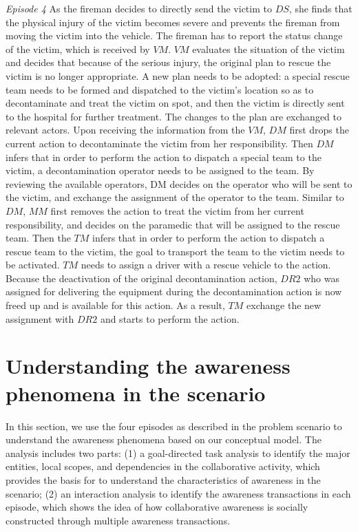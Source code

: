 \begin{scenario}
\footnotesize
\emph{Episode 4} As the fireman decides to directly send the victim to $DS$, she finds that the physical injury of the victim becomes severe and prevents the fireman from moving the victim into the vehicle. The fireman has to report the status change of the victim, which is received by $VM$. $VM$ evaluates the situation of the victim and decides that because of the serious injury, the original plan to rescue the victim is no longer appropriate. A new plan needs to be adopted: a special rescue team needs to be formed and dispatched to the victim’s location so as to decontaminate and treat the victim on spot, and then the victim is directly sent to the hospital for further treatment. The changes to the plan are exchanged to relevant actors. Upon receiving the information from the $VM$, $DM$ first drops the current action to decontaminate the victim from her responsibility. Then $DM$ infers that in order to perform the action to dispatch a special team to the victim, a decontamination operator needs to be assigned to the team. By reviewing the available operators, DM decides on the operator who will be sent to the victim, and exchange the assignment of the operator to the team. Similar to $DM$, $MM$ first removes the action to treat the victim from her current responsibility, and decides on the paramedic that will be assigned to the rescue team. Then the $TM$ infers that in order to perform the action to dispatch a rescue team to the victim, the goal to transport the team to the victim needs to be activated. $TM$ needs to assign a driver with a rescue vehicle to the action. Because the deactivation of the original decontamination action, $DR2$ who was assigned for delivering the equipment during the decontamination action is now freed up and is available for this action. As a result, $TM$ exchange the new assignment with $DR2$ and starts to perform the action.
\end{scenario}

\section{Understanding the awareness phenomena in the scenario} %
\label{sec:understanding_the_awareness_phenomena_in_the_scenario}
In this section, we use the four episodes as described in the problem scenario to understand the awareness phenomena based on our conceptual model. The analysis includes two parts: (1) a goal-directed task analysis to identify the major entities, local scopes, and dependencies in the collaborative activity, which provides the basis for to understand the characteristics of awareness in the scenario; (2) an interaction analysis to identify the awareness transactions in each episode, which shows the idea of how collaborative awareness is socially constructed through multiple awareness transactions. 

